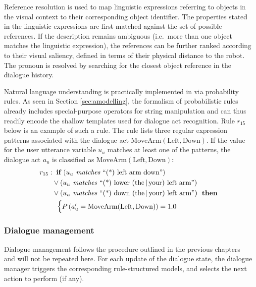 Reference resolution is used to map linguistic expressions referring to objects in the visual context to their corresponding object identifier. The properties stated in the linguistic expressions are first matched against the set of possible references.  If the description remains ambiguous (i.e.\ more than one object matches the linguistic expression), the references can be further ranked according to their visual saliency, defined in terms of their physical distance to the robot.  The pronoun  is resolved by searching for the closest object reference in the dialogue history. 

Natural language understanding is practically implemented in \opendial{} via probability rules.  As seen in Section \ref{sec:amodelling}, the formalism of probabilistic rules already includes special-purpose operators for string manipulation and can thus readily encode the shallow templates used for dialogue act recognition.  Rule $r_{15}$ below is an example of such a rule.  The rule lists three regular expression patterns associated with the dialogue act $\mathrm{MoveArm(Left,Down)}$.  If the value for the user utterance variable $u_u$ matches at least one of the patterns, the dialogue act $a_u$ is classified as $\mathrm{MoveArm(Left,Down)}$:
\begin{align*}
r_{15}: &\;\;\textbf{if} \ (u_u \textit{ matches } \text{``(*) left arm down''} ) \\ 
& \lor (u_u \textit{ matches } \text{``(*) lower (the\,|\,your) left arm''} ) \\
& \lor (u_u \textit{ matches } \text{``(*) down (the\,|\,your) left arm''}   )  \ \ \textbf{then} \\ 
& \; \; \begin{cases} P\left(a_u' = \mathrm{MoveArm(Left,Down)}\right) = 1.0 \end{cases}
\end{align*}

\subsubsection*{Dialogue management}

Dialogue management follows the procedure outlined in the previous chapters and will not be repeated here. For each update of the dialogue state, the dialogue manager triggers the corresponding rule-structured models, and selects the next action to perform (if any). 

